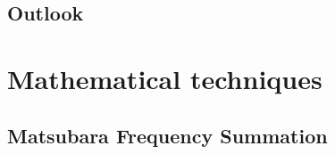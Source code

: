 \documentclass[a4paper,12pt]{report}
\begin{document}
\section{Outlook}

% 
























\appendix

\chapter{Mathematical techniques}

\section{Matsubara Frequency Summation} \label{MFS}
\end{document}
